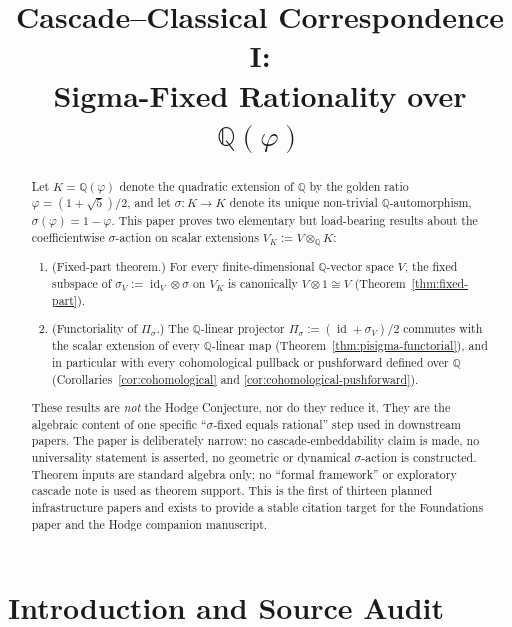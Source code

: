 \documentclass[11pt, a4paper]{amsart}
\title{Cascade--Classical Correspondence I:\\
  Sigma-Fixed Rationality over $\mathbb{Q}(\varphi)$}
\author{}
\date{}
\theoremstyle{definition}
\newcommand{\Q}{\mathbb{Q}}
\newcommand{\id}{\operatorname{id}}
\begin{document}
\maketitle

\begin{abstract}
Let $K = \Q(\varphi)$ denote the quadratic extension of $\Q$ by the
golden ratio $\varphi = (1+\sqrt{5})/2$, and let
$\sigma \colon K \to K$ denote its unique non-trivial $\Q$-automorphism,
$\sigma(\varphi) = 1 - \varphi$. This paper proves two elementary but
load-bearing results about the coefficientwise $\sigma$-action on
scalar extensions $V_K := V \otimes_\Q K$:
\begin{enumerate}
\item (Fixed-part theorem.) For every finite-dimensional $\Q$-vector
  space $V$, the fixed subspace of $\sigma_V := \id_V \otimes \sigma$
  on $V_K$ is canonically $V \otimes 1 \cong V$
  (Theorem~\ref{thm:fixed-part}).
\item (Functoriality of $\Pi_\sigma$.) The $\Q$-linear projector
  $\Pi_\sigma := (\id + \sigma_V)/2$ commutes with the scalar
  extension of every $\Q$-linear map
  (Theorem~\ref{thm:pisigma-functorial}), and in particular with
  every cohomological pullback or pushforward defined over $\Q$
  (Corollaries~\ref{cor:cohomological} and
  \ref{cor:cohomological-pushforward}).
\end{enumerate}

These results are \emph{not} the Hodge Conjecture, nor do they
reduce it. They are the algebraic content of one specific
``$\sigma$-fixed equals rational'' step used in downstream
papers. The paper is deliberately narrow: no cascade-embeddability
claim is made, no universality statement is asserted, no geometric
or dynamical $\sigma$-action is constructed. Theorem inputs are
standard algebra only; no ``formal framework'' or exploratory
cascade note is used as theorem support. This is the first of
thirteen planned infrastructure papers and exists to provide a
stable citation target for the Foundations paper and the Hodge
companion manuscript.
\end{abstract}

\tableofcontents

\section{Introduction and Source Audit}
\label{sec:intro}
\end{document}
